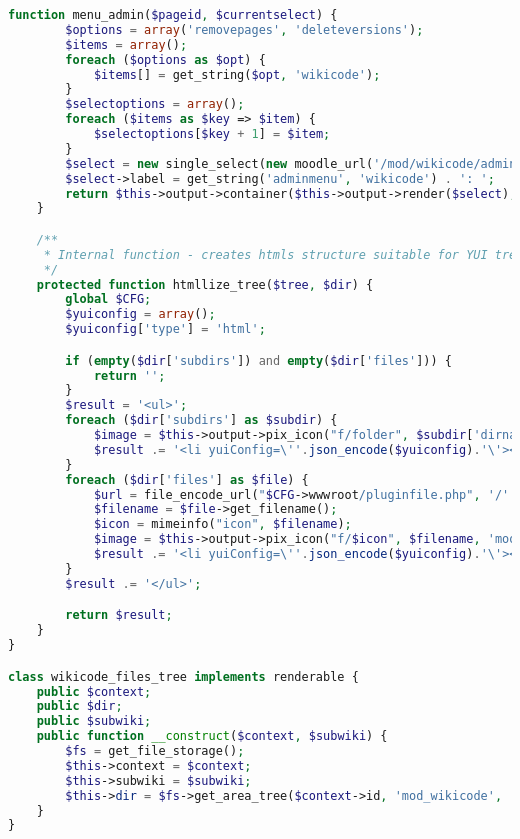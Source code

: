 \begin{lstlisting}[language=PHP]
    function menu_admin($pageid, $currentselect) {
        $options = array('removepages', 'deleteversions');
        $items = array();
        foreach ($options as $opt) {
            $items[] = get_string($opt, 'wikicode');
        }
        $selectoptions = array();
        foreach ($items as $key => $item) {
            $selectoptions[$key + 1] = $item;
        }
        $select = new single_select(new moodle_url('/mod/wikicode/admin.php', array('pageid' => $pageid)), 'option', $selectoptions, $currentselect);
        $select->label = get_string('adminmenu', 'wikicode') . ': ';
        return $this->output->container($this->output->render($select), 'midpad');
    }

    /**
     * Internal function - creates htmls structure suitable for YUI tree.
     */
    protected function htmllize_tree($tree, $dir) {
        global $CFG;
        $yuiconfig = array();
        $yuiconfig['type'] = 'html';

        if (empty($dir['subdirs']) and empty($dir['files'])) {
            return '';
        }
        $result = '<ul>';
        foreach ($dir['subdirs'] as $subdir) {
            $image = $this->output->pix_icon("f/folder", $subdir['dirname'], 'moodle', array('class'=>'icon'));
            $result .= '<li yuiConfig=\''.json_encode($yuiconfig).'\'><div>'.$image.' '.s($subdir['dirname']).'</div> '.$this->htmllize_tree($tree, $subdir).'</li>';
        }
        foreach ($dir['files'] as $file) {
            $url = file_encode_url("$CFG->wwwroot/pluginfile.php", '/'.$tree->context->id.'/mod_wiki/attachments/' . $tree->subwiki->id . '/'. $file->get_filepath() . $file->get_filename(), true);
            $filename = $file->get_filename();
            $icon = mimeinfo("icon", $filename);
            $image = $this->output->pix_icon("f/$icon", $filename, 'moodle', array('class'=>'icon'));
            $result .= '<li yuiConfig=\''.json_encode($yuiconfig).'\'><div>'.$image.' '.html_writer::link($url, $filename).'</div></li>';
        }
        $result .= '</ul>';

        return $result;
    }
}

class wikicode_files_tree implements renderable {
    public $context;
    public $dir;
    public $subwiki;
    public function __construct($context, $subwiki) {
        $fs = get_file_storage();
        $this->context = $context;
        $this->subwiki = $subwiki;
        $this->dir = $fs->get_area_tree($context->id, 'mod_wikicode', 'attachments', $subwiki->id);
    }
}
\end{lstlisting}

